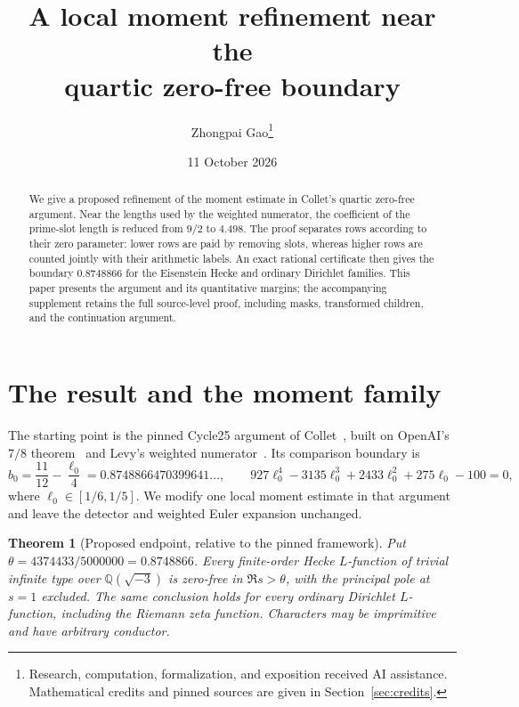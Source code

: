 \documentclass[11pt]{article}
\title{A local moment refinement near the\\quartic zero-free boundary}
\author{Zhongpai Gao\thanks{Research, computation, formalization, and exposition received AI assistance. Mathematical credits and pinned sources are given in Section~\ref{sec:credits}.}}
\date{11 October 2026}
\newtheorem{theorem}{Theorem}[section]
\begin{document}
\maketitle
\begin{abstract}
We give a proposed refinement of the moment estimate in Collet's quartic
zero-free argument. Near the lengths used by the weighted numerator, the
coefficient of the prime-slot length is reduced from $9/2$ to $4.498$.
The proof separates rows according to their zero parameter: lower rows
are paid by removing slots, whereas higher rows are counted jointly
with their arithmetic labels. An exact rational certificate then gives
the boundary $0.8748866$ for the Eisenstein Hecke and ordinary Dirichlet
families. This paper presents the argument and its quantitative margins;
the accompanying supplement retains the full source-level proof,
including masks, transformed children, and the continuation argument.
\end{abstract}

\section{The result and the moment family}\label{sec:setting}

The starting point is the pinned Cycle25 argument of Collet~\cite{collet},
built on OpenAI's $7/8$ theorem~\cite{openai} and Levy's weighted
numerator~\cite{levy}. Its comparison boundary is
\[
 b_0=\frac{11}{12}-\frac{\ell_0}{4}
 =0.8748866470399641\ldots,
 \qquad
 927\ell_0^4-3135\ell_0^3+2433\ell_0^2+275\ell_0-100=0,
\]
where $\ell_0\in[1/6,1/5]$. We modify one local moment estimate in that
argument and leave the detector and weighted Euler expansion unchanged.

\begin{theorem}[Proposed endpoint, relative to the pinned framework]\label{thm:endpoint}
Put $\theta=4374433/5000000=0.8748866$. Every finite-order Hecke
$L$-function of trivial infinite type over $\mathbb Q(\sqrt{-3})$ is
zero-free in $\Re s>\theta$, with the principal pole at $s=1$ excluded.
The same conclusion holds for every ordinary Dirichlet $L$-function,
including the Riemann zeta function. Characters may be imprimitive and
have arbitrary conductor.
\end{theorem}
\end{document}
